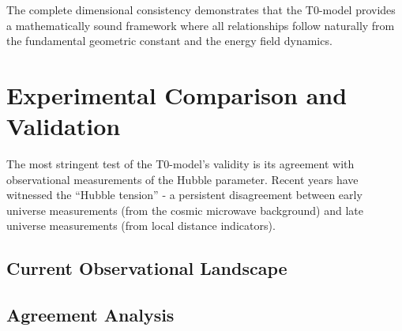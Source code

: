 \documentclass[12pt,a4paper]{report}
\begin{document}
	The complete dimensional consistency demonstrates that the T0-model provides a mathematically sound framework where all relationships follow naturally from the fundamental geometric constant and the energy field dynamics.
	
	\section{Experimental Comparison and Validation}
	
	The most stringent test of the T0-model's validity is its agreement with observational measurements of the Hubble parameter. Recent years have witnessed the ``Hubble tension'' - a persistent disagreement between early universe measurements (from the cosmic microwave background) and late universe measurements (from local distance indicators).
	
	\subsection{Current Observational Landscape}
	
	\begin{table}[htbp]
		\centering
		\caption{Comparison of T0 prediction with experimental measurements}
		\label{tab:h0_comparison}
	\end{table}
	
	\subsection{Agreement Analysis}
	
\end{document}
